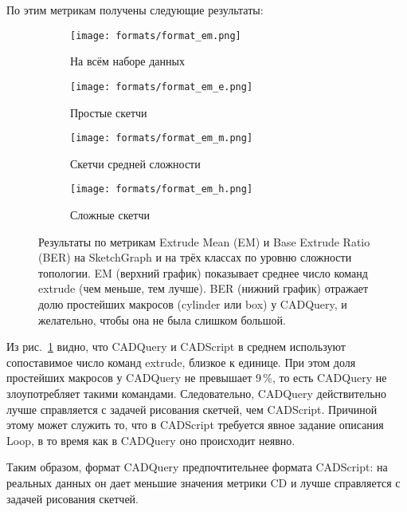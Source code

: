 По этим метрикам получены следующие результаты:

\begin{figure}[h!]
    \centering
    \begin{subfigure}{0.45\linewidth}
        \centering
        \texttt{[image: formats/format\_em.png]}
        \caption{На всём наборе данных}
    \end{subfigure}
    \hfill
    \begin{subfigure}{0.45\linewidth}
        \centering
        \texttt{[image: formats/format\_em\_e.png]}
        \caption{Простые скетчи}
    \end{subfigure}

    \vspace{1em}

    \begin{subfigure}{0.45\linewidth}
        \centering
        \texttt{[image: formats/format\_em\_m.png]}
        \caption{Скетчи средней сложности}
    \end{subfigure}
    \hfill
    \begin{subfigure}{0.45\linewidth}
        \centering
        \texttt{[image: formats/format\_em\_h.png]}
        \caption{Сложные скетчи}
    \end{subfigure}

    \caption{Результаты по метрикам Extrude Mean (EM) и Base Extrude Ratio (BER) на SketchGraph и на трёх классах по уровню сложности топологии.
        EM (верхний график) показывает среднее число команд extrude (чем меньше, тем лучше).
        BER (нижний график) отражает долю простейших макросов (cylinder или box) у CADQuery, и желательно, чтобы она не была слишком большой.}
    \label{fig:exp3}
\end{figure}

Из рис.~\ref{fig:exp3} видно, что CADQuery и CADScript в среднем используют сопоставимое число команд extrude, близкое к единице. При этом доля простейших макросов у CADQuery не превышает 9\,\%,
то есть CADQuery не злоупотребляет такими командами. Следовательно, CADQuery действительно лучше справляется с задачей рисования скетчей, чем CADScript.
Причиной этому может служить то, что в CADScript требуется явное задание описания Loop, в то время как в CADQuery оно происходит неявно.

Таким образом, формат CADQuery предпочтительнее формата CADScript: на реальных данных он дает меньшие значения метрики CD и лучше справляется с задачей рисования скетчей.

